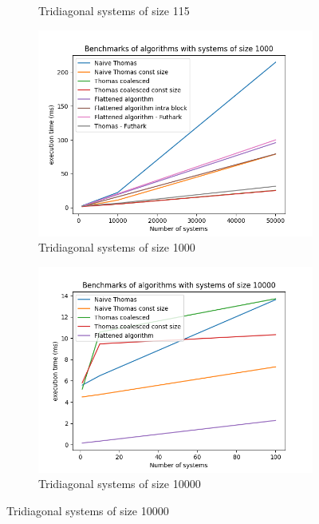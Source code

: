 \documentclass[a4paper,oneside]{memoir}
\begin{document}
\begin{figure}[H]
\begin{subfigure}[b]{0.6\textwidth}
    \caption{Tridiagonal systems of size 115}
    \label{fig:bench115}
        \end{subfigure}
    \begin{subfigure}[b]{0.6\textwidth}
        \centering
    \includegraphics[width=\textwidth]{timings_1000.png}
    \caption{Tridiagonal systems of size 1000}
    \label{fig:bench1000}
    \end{subfigure}
    \begin{subfigure}[b]{0.6\textwidth}
        \centering
    \includegraphics[width=\textwidth]{timings_10000.png}
    \caption{Tridiagonal systems of size 10000}
    \label{fig:bench10000}
    \end{subfigure}
    
 \end{figure}
\end{document}
